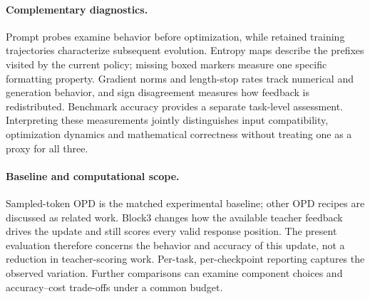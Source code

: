 \paragraph{Complementary diagnostics.}
Prompt probes examine behavior before optimization, while retained training trajectories characterize subsequent evolution. Entropy maps describe the prefixes visited by the current policy; missing boxed markers measure one specific formatting property. Gradient norms and length-stop rates track numerical and generation behavior, and sign disagreement measures how feedback is redistributed. Benchmark accuracy provides a separate task-level assessment. Interpreting these measurements jointly distinguishes input compatibility, optimization dynamics and mathematical correctness without treating one as a proxy for all three.

\paragraph{Baseline and computational scope.}
Sampled-token OPD is the matched experimental baseline; other OPD recipes are discussed as related work. Block3 changes how the available teacher feedback drives the update and still scores every valid response position. The present evaluation therefore concerns the behavior and accuracy of this update, not a reduction in teacher-scoring work. Per-task, per-checkpoint reporting captures the observed variation. Further comparisons can examine component choices and accuracy--cost trade-offs under a common budget.
